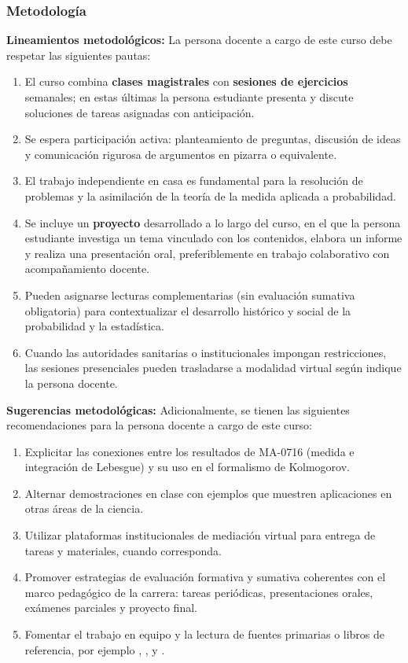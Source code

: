 \begin{refsection}
\begin{enumerate}
\end{enumerate}

\subsubsection*{Metodología}

\noindent \textbf{Lineamientos metodológicos:} La persona docente a cargo de este curso debe respetar las siguientes pautas:

\begin{enumerate}
    \item El curso combina \textbf{clases magistrales} con \textbf{sesiones de ejercicios} semanales; en estas últimas la persona estudiante presenta y discute soluciones de tareas asignadas con anticipación.
    \item Se espera participación activa: planteamiento de preguntas, discusión de ideas y comunicación rigurosa de argumentos en pizarra o equivalente.
    \item El trabajo independiente en casa es fundamental para la resolución de problemas y la asimilación de la teoría de la medida aplicada a probabilidad.
    \item Se incluye un \textbf{proyecto} desarrollado a lo largo del curso, en el que la persona estudiante investiga un tema vinculado con los contenidos, elabora un informe y realiza una presentación oral, preferiblemente en trabajo colaborativo con acompañamiento docente.
    \item Pueden asignarse lecturas complementarias (sin evaluación sumativa obligatoria) para contextualizar el desarrollo histórico y social de la probabilidad y la estadística.
    \item Cuando las autoridades sanitarias o institucionales impongan restricciones, las sesiones presenciales pueden trasladarse a modalidad virtual según indique la persona docente.
\end{enumerate}

\textbf{Sugerencias metodológicas:} Adicionalmente, se tienen las siguientes recomendaciones para la persona docente a cargo de este curso:

\begin{enumerate}
    \item Explicitar las conexiones entre los resultados de MA-0716 (medida e integración de Lebesgue) y su uso en el formalismo de Kolmogorov.
    \item Alternar demostraciones en clase con ejemplos que muestren aplicaciones en otras áreas de la ciencia.
    \item Utilizar plataformas institucionales de mediación virtual para entrega de tareas y materiales, cuando corresponda.
    \item Promover estrategias de evaluación formativa y sumativa coherentes con el marco pedagógico de la carrera: tareas periódicas, presentaciones orales, exámenes parciales y proyecto final.
    \item Fomentar el trabajo en equipo y la lectura de fuentes primarias o libros de referencia, por ejemplo \cite{AshDD99}, \cite{Bil95}, \cite{Dur19} y \cite{Gri20}.
\end{enumerate}


\end{refsection}
